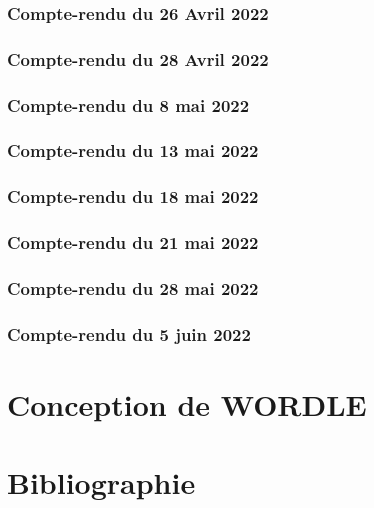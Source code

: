 \documentclass{article}
\begin{document}
\subsubsection{Compte-rendu du 26 Avril 2022}


\subsubsection{Compte-rendu du 28 Avril 2022}


\subsubsection{Compte-rendu du 8 mai 2022}


\subsubsection{Compte-rendu du 13 mai 2022}


\subsubsection{Compte-rendu du 18 mai 2022}


\subsubsection{Compte-rendu du 21 mai 2022}


\subsubsection{Compte-rendu du 28 mai 2022}


\subsubsection{Compte-rendu du 5 juin 2022}


\newpage
\section{Conception de WORDLE}


\newpage
\section{Bibliographie}
\end{document}
